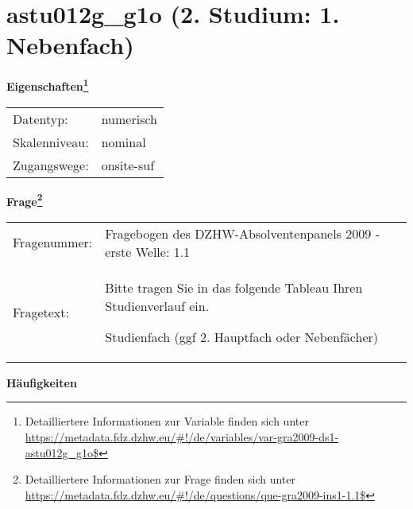 
    \setcounter{footnote}{0}

    \vspace*{-1.8cm}
	\section{astu012g\_g1o (2. Studium: 1. Nebenfach)}
	\label{section:astu012g_g1o}



    \vspace*{0.5cm}
    \noindent\textbf{Eigenschaften\footnote{Detailliertere Informationen zur Variable finden sich unter
		\url{https://metadata.fdz.dzhw.eu/\#!/de/variables/var-gra2009-ds1-astu012g_g1o$}}}\\
	\begin{tabularx}{\hsize}{@{}lX}
	Datentyp: & numerisch \\
	Skalenniveau: & nominal \\
	Zugangswege: &
	  onsite-suf
 \\
    \end{tabularx}



				\vspace*{0.5cm}
                \noindent\textbf{Frage\footnote{Detailliertere Informationen zur Frage finden sich unter
		              \url{https://metadata.fdz.dzhw.eu/\#!/de/questions/que-gra2009-ins1-1.1$}}}\\
				\begin{tabularx}{\hsize}{@{}lX}
					Fragenummer: &
					  Fragebogen des DZHW-Absolventenpanels 2009 - erste Welle:
					  1.1
 \\
					Fragetext: & Bitte tragen Sie in das folgende Tableau Ihren Studienverlauf ein.\par  Studienfach (ggf 2. Hauptfach oder Nebenfächer) \\
				\end{tabularx}





        		\vspace*{0.5cm}
                \noindent\textbf{Häufigkeiten}

